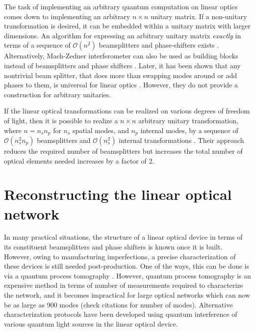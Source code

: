 \documentclass[aps,rmp,twocolumn,amsmath,amssymb,nofootinbib,superscriptaddress]{revtex4}
\begin{document}
The task of implementing an arbitrary quantum computation on linear optics comes down to implementing an arbitrary $n\times n$ unitary matrix. If a non-unitary transformation is desired, it can be embedded within a unitary matrix with larger dimensions. An algorithm for expressing an arbitrary unitary matrix {\it exactly} in terms of a sequence of $\mathcal{O}(n^2)$ beamsplitters and phase-shifters exists \cite{bib:Reck1994}. Alternatively, Mach-Zedner interferometer can also be used as building blocks instead of beamsplitters and phase shifters \cite{bib:Reck1994, bib:Englert2001}. Later, it has been shown that any nontrivial beam splitter, that does more than swapping modes around or add phases to them, is universal for linear optics \cite{bib:Bouland2014}. However, they do not provide a construction for arbitrary unitaries.

If the linear optical transformations can be realized on various degrees of freedom of light, then it is possible to realize a $n\times n$ arbitrary unitary transformation, where $n=n_s n_p$ for $n_s$ spatial modes, and $n_p$ internal modes, by a sequence of $\mathcal{O}(n_s^2 n_p)$ beamsplitters and $\mathcal{O}(n_s^2)$ internal transformations \cite{bib:Dhand2015}. Their approach reduces the required number of beamsplitters but increases the total number of optical elements needed increases by a factor of 2.

\section{Reconstructing the linear optical network}

In many practical situations, the structure of a linear optical device in terms of its constituent beamsplitters and phase shifters is known once it is built. However, owing to manufacturing imperfections, a precise characterization of these devices is still needed post-production. One of the ways, this can be done is via a quantum process tomography \cite{bib:Mitchell03,bib:Obrien04,bib:Lobino08,bib:Saleh11} . However, quantum process tomography is an expensive method in terms of number of measurements required to characterize the network, and it becomes impractical for large optical networks which can now be as large as 900 modes (check citations for number of modes). Alternative characterization protocols have been developed using quantum interference of various quantum light sources \cite{bib:Laing12,bib:Rahimi-Keshari13} in the linear optical device.
\end{document}
